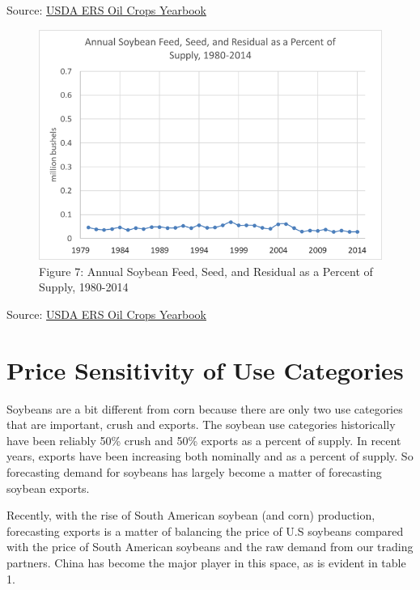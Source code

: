 \documentclass[
  letterpaper,
  DIV=11,
  numbers=noendperiod]{scrreprt}
\begin{document}
Source:
\href{http://www.ers.usda.gov/data-products/oil-crops-yearbook.aspx}{USDA
ERS Oil Crops Yearbook}

\begin{figure}

{\centering \includegraphics{Excel-files/ForecastingUseSoy-OilCropsYearbook_files/image012.png}

}

\caption{Figure 7: Annual Soybean Feed, Seed, and Residual as a Percent
of Supply, 1980-2014}

\end{figure}

Source:
\href{http://www.ers.usda.gov/data-products/oil-crops-yearbook.aspx}{USDA
ERS Oil Crops Yearbook}

\hypertarget{price-sensitivity-of-use-categories-1}{%
\section{Price Sensitivity of Use
Categories}\label{price-sensitivity-of-use-categories-1}}

Soybeans are a bit different from corn because there are only two use
categories that are important, crush and exports. The soybean use
categories historically have been reliably 50\% crush and 50\% exports
as a percent of supply. In recent years, exports have been increasing
both nominally and as a percent of supply. So forecasting demand for
soybeans has largely become a matter of forecasting soybean exports.

Recently, with the rise of South American soybean (and corn) production,
forecasting exports is a matter of balancing the price of U.S soybeans
compared with the price of South American soybeans and the raw demand
from our trading partners. China has become the major player in this
space, as is evident in table 1.
\end{document}
